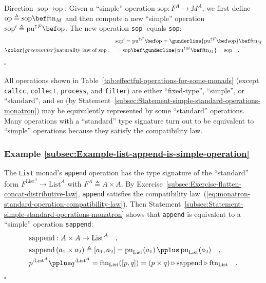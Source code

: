 Direction $\text{sop}\rightarrow\text{op}$: Given a \textsf{``}simple\textsf{''}
operation $\text{sop}:F^{A}\rightarrow M^{A}$, we first define $\text{op}\triangleq\text{sop}\bef\text{ftn}_{M}$
and then compute a new \textsf{``}simple\textsf{''} operation $\text{sop}^{\prime}\triangleq\text{pu}^{\uparrow F}\bef\text{op}$.
The new operation \lstinline!sop!$^{\prime}$ equals \lstinline!sop!:
\begin{align*}
 & \text{sop}^{\prime}=\text{pu}^{\uparrow F}\bef\text{op}=\gunderline{\text{pu}^{\uparrow F}\bef\text{sop}}\bef\text{ftn}_{M}\\
{\color{greenunder}\text{naturality law of }\text{sop}:}\quad & =\text{sop}\bef\gunderline{\text{pu}^{\uparrow M}\bef\text{ftn}_{M}}=\text{sop}\quad.
\end{align*}
$\square$

All operations shown in Table~\ref{tab:effectful-operations-for-some-monads}
(except \lstinline!callcc!, \lstinline!collect!, \lstinline!process!,
and \lstinline!filter!) are either \textsf{``}fixed-type\textsf{''}, \textsf{``}simple\textsf{''},
or \textsf{``}standard\textsf{''}, and so (by Statement~\ref{subsec:Statement-simple-standard-operations-monatron})
may be equivalently represented by some \textsf{``}standard\textsf{''} operations.
Many operations with a \textsf{``}standard\textsf{''} type signature turn out to be
equivalent to \textsf{``}simple\textsf{''} operations because they satisfy the compatibility
law. 

\subsubsection{Example \label{subsec:Example-list-append-is-simple-operation}\ref{subsec:Example-list-append-is-simple-operation}}

The \lstinline!List! monad\textsf{'}s \lstinline!append! operation has the
type signature of the \textsf{``}standard\textsf{''} form $F^{\text{List}^{A}}\rightarrow\text{List}^{A}$
with $F^{A}\triangleq A\times A$. By Exercise~\ref{subsec:Exercise-flatten-concat-distributive-law},
\lstinline!append! satisfies the compatibility law~(\ref{eq:monatron-standard-operation-compatibility-law}).
Then Statement~\ref{subsec:Statement-simple-standard-operations-monatron}
shows that \lstinline!append! is equivalent to a \textsf{``}simple\textsf{''} operation
\lstinline!sappend!:
\begin{align*}
 & \text{sappend}:A\times A\rightarrow\text{List}^{A}\quad,\\
 & \text{sappend}\left(a_{1}\times a_{2}\right)\triangleq[a_{1},a_{2}]=\text{pu}_{\text{List}}(a_{1})\,\pplus\,\text{pu}_{\text{List}}(a_{2})\quad,\\
 & p^{:\text{List}^{A}}\pplus q^{:\text{List}^{A}}=\text{ftn}_{\text{List}}([p,q])=\left(p\times q\right)\triangleright\text{sappend}\triangleright\text{ftn}_{\text{List}}\quad.
\end{align*}
$\square$

